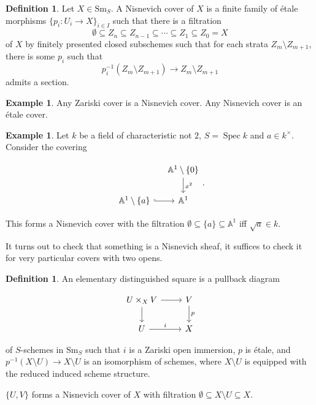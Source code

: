 \documentclass{shortart}
\theoremstyle{definition}
\newtheorem{defi}[thm]{Definition}
\newtheorem{eg}[thm]{Example}
\newcommand\Sm{\mathrm{Sm}}
\newcommand\A{\mathbb{A}}
\DeclareMathOperator\Spec{Spec}
\begin{document}
\begin{defi}
  Let $X \in \Sm_S$. A Nisnevich cover of $X$ is a finite family of \'etale morphisms $\{p_i: U_i \to X\}_{i \in I}$ such that there is a filtration
  \[
    \emptyset \subseteq Z_n \subseteq Z_{n - 1} \subseteq \cdots \subseteq Z_1 \subseteq Z_0 = X
  \]
  of $X$ by finitely presented closed subschemes such that for each strata $Z_m \setminus Z_{m + 1}$, there is some $p_i$ such that
  \[
    p_i^{-1}(Z_m \setminus Z_{m + 1}) \to Z_m \setminus Z_{m + 1}
  \]
  admits a section.
\end{defi}

\begin{eg}
  Any Zariski cover is a Nisnevich cover. Any Nisnevich cover is an \'etale cover.
\end{eg}

\begin{eg}
  Let $k$ be a field of characteristic not $2$, $S = \Spec k$ and $a \in k^\times$. Consider the covering
  \begin{useimager}
    \[
      \begin{tikzcd}[column sep=small]
        & \A^1 \setminus \{0\} \ar[d, "x^2"]\\
        \A^1 \setminus \{a\} \ar[r, hook] & \A^1
      \end{tikzcd}.
    \]
  \end{useimager}

  This forms a Nisnevich cover with the filtration $\emptyset \subseteq \{a\} \subseteq \A^1$ iff $\sqrt{a} \in k$.
\end{eg}

It turns out to check that something is a Nisnevich sheaf, it suffices to check it for very particular covers with two opens.

\begin{defi}
  An elementary distinguished square is a pullback diagram
  \begin{useimager}
    \[
      \begin{tikzcd}
        U \times_X V \ar[r] \ar[d] & V \ar[d, "p"]\\
        U \ar[r, "i"] & X
      \end{tikzcd}
    \]
  \end{useimager}
  of $S$-schemes in $\Sm_S$ such that $i$ is a Zariski open immersion, $p$ is \'etale, and $p^{-1}(X \setminus U) \to X \setminus U$ is an isomorphism of schemes, where $X \setminus U$ is equipped with the reduced induced scheme structure.
\end{defi}
$\{U, V\}$ forms a Nisnevich cover of $X$ with filtration $\emptyset \subseteq X \setminus U \subseteq X$.
\end{document}
